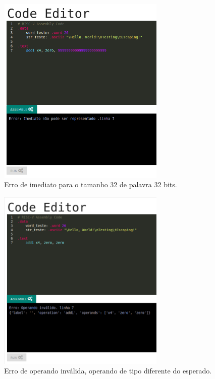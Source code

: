 	\begin{figure}[h]
	  \centering
	  \includegraphics[width=8cm]{img/assemble_error_imediato.png}
	  \caption{Erro de imediato para o tamanho 32 de palavra 32 bits.}
	  \label{fig:assemble_error_imediato}
	\end{figure}

	\begin{figure}[h]
	  \centering
	  \includegraphics[width=8cm]{img/assemble_error_operando_invalido.png}
	  \caption{Erro de operando inválida, operando de tipo diferente do esperado.}
	  \label{fig:assemble_error_operando_invalido}
	\end{figure}

